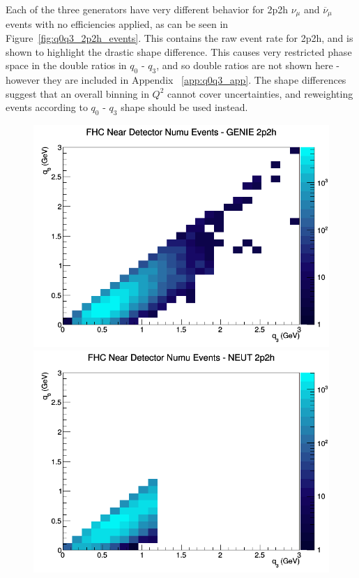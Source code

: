 \documentclass[12pt]{article}
\begin{document}
Each of the three generators have very different behavior for 2p2h $\nu_\mu$ and $\overline{\nu}_{\mu}$ events with no efficiencies applied, as can be seen in Figure~\ref{fig:q0q3_2p2h_events}. This contains the raw event rate for 2p2h, and is shown to highlight the drastic shape difference. This causes very restricted phase space in the double ratios in $q_0 \textrm{ - } q_3$, and so double ratios are not shown here - however they are included in Appendix ~\ref{app:q0q3_app}. The shape differences suggest that an overall binning in $Q^2$ cannot cover uncertainties, and reweighting events according to $q_0 \textrm{ - } q_3$ shape should be used instead.
\begin{figure}[h]
\centering
{}
\includegraphics[width=\linewidth]{q0_q3/nominal/2p2h_FHC_ND_numu_q3_q0_GENIE.png}
\endminipage
{}
\includegraphics[width=\linewidth]{q0_q3/nominal/2p2h_FHC_ND_numu_q3_q0_NEUT.png}

\end{figure}
\end{document}

